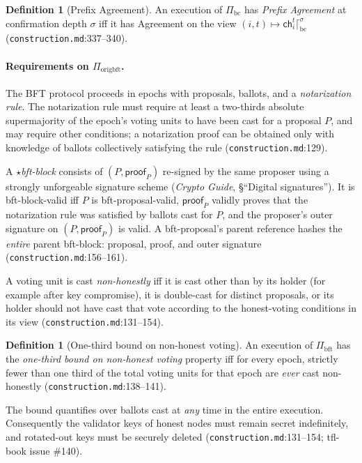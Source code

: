 \documentclass[11pt,a4paper]{article}
\theoremstyle{definition}
\newtheorem{definition}[theorem]{Definition}
\begin{document}
\begin{definition}[Prefix Agreement]\label{def:xl-prefix-agreement}
An execution of $\Pi_{\mathrm{bc}}$ has \emph{Prefix Agreement} at
confirmation depth $\sigma$ iff it has Agreement on the view $(i, t)
\mapsto \mathsf{ch}_i^t \lceil^{\sigma}_{\mathrm{bc}}$
(\texttt{construction.md}:337--340).
\end{definition}

\paragraph{Requirements on $\Pi_{\mathrm{origbft}}$.} The BFT protocol
proceeds in epochs with proposals, ballots, and a \emph{notarization
rule}. The notarization rule must require at least a two-thirds absolute
supermajority of the epoch's voting units to have been cast for a
proposal $P$, and may require other conditions; a notarization proof can
be obtained only with knowledge of ballots collectively satisfying the
rule (\texttt{construction.md}:129).

A \emph{$\star$bft-block} consists of $(P, \mathsf{proof}_P)$ re-signed by
the same proposer using a strongly unforgeable signature scheme
(\emph{Crypto Guide}, \S``Digital signatures''). It is
bft-block-valid iff $P$ is bft-proposal-valid, $\mathsf{proof}_P$ validly
proves that the notarization rule was satisfied by ballots cast for $P$,
and the proposer's outer signature on $(P, \mathsf{proof}_P)$ is valid. A
bft-proposal's parent reference hashes the \emph{entire} parent bft-block:
proposal, proof, and outer signature (\texttt{construction.md}:156--161).

A voting unit is cast \emph{non-honestly} iff it is cast other than by its
holder (for example after key compromise), it is double-cast for distinct
proposals, or its holder should not have cast that vote according to the
honest-voting conditions in its view (\texttt{construction.md}:131--154).

\begin{definition}[One-third bound on non-honest
voting]\label{def:xl-one-third}
An execution of $\Pi_{\mathrm{bft}}$ has the \emph{one-third bound on
non-honest voting} property iff for every epoch, strictly fewer than one
third of the total voting units for that epoch are \emph{ever} cast
non-honestly (\texttt{construction.md}:138--141).
\end{definition}

The bound quantifies over ballots cast at \emph{any} time in the entire
execution. Consequently the validator keys of honest nodes must remain
secret indefinitely, and rotated-out keys must be securely deleted
(\texttt{construction.md}:131--154; tfl-book issue \#140).
\end{document}
